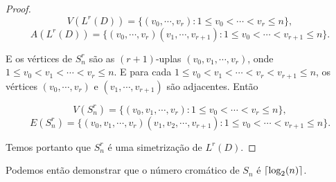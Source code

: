 \begin{proof}
\[V(L^r(D)) = \{(v_0,\cdots,v_{r}) : 1\leq v_0 < \cdots < v_r \leq n\},\]
\[A(L^r(D)) = \{(v_0,\cdots,v_{r})(v_1,\cdots,v_{r+1}) : 1\leq v_0 < \cdots < v_{r+1} \leq n\}.\]

E os vértices de $S_n^r$ são as $(r+1)$-uplas $(v_0, v_1, \cdots, v_r)$, onde $1\leq v_0 < v_1 < \cdots < v_r \leq n$. E para cada $1 \leq v_0 < v_1 <\cdots < v_r < v_{r+1} \leq n$, os vértices $(v_0, \cdots, v_r)$ e $(v_1, \cdots, v_{r+1})$ são adjacentes. Então 

\[V(S_n^r) = \{(v_0, v_1, \cdots, v_r) : 1 \leq v_0 < \cdots < v_r \leq n\},\]
\[E(S_n^r) = \{(v_0, v_1, \cdots, v_r)(v_1, v_2, \cdots, v_{r+1}) : 1 \leq v_0 < \cdots < v_{r+1} \leq n\}.\]

Temos portanto que $S_n^r$ é uma simetrização de $L^r(D)$.
\end{proof}

Podemos então demonstrar que o número cromático de $S_n$ é $\lceil\log_2(n)\rceil$.


